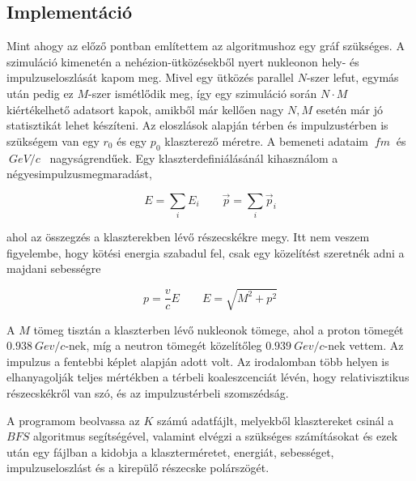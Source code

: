 \documentclass[a4paper,12pt]{article}
\begin{document}
\subsection{ Implementáció}

\par Mint ahogy az előző pontban említettem az algoritmushoz egy gráf szükséges. A szimuláció kimenetén a nehézion-ütközésekből nyert nukleonon hely- és impulzuseloszlását kapom meg. Mivel egy ütközés parallel $N$-szer lefut, egymás után pedig ez $M$-szer ismétlődik meg, így egy szimuláció során $N\cdot M$ kiértékelhető adatsort kapok, amikből már kellően nagy $N, M$ esetén már jó statisztikát lehet készíteni. Az eloszlások alapján térben és impulzustérben is szükségem van egy $r_{0}$ és egy $p_{0}$ klaszterező méretre. A bemeneti adataim $~fm~$ és $~GeV/c$~ nagyságrendűek. Egy klaszterdefiniálásánál kihasználom a négyesimpulzusmegmaradást, 

\begin{equation*}
	E = \sum_{i} E_{i} \quad \quad \vec{p} = \sum_{i} \vec{p}_{i}
\end{equation*} 

\par ahol az összegzés a klaszterekben lévő részecskékre megy. Itt nem veszem figyelembe, hogy kötési energia szabadul fel, csak egy közelítést szeretnék adni a majdani sebességre

\begin{equation*}
	p = \frac{v}{c} E \quad \quad E = \sqrt{M^{2} + p^{2}}
\end{equation*}

\par A $M$ tömeg tisztán a klaszterben lévő nukleonok tömege, ahol a proton tömegét $0.938 ~Gev/c$-nek, míg a neutron tömegét közelítőleg $0.939 ~Gev/c$-nek vettem. Az impulzus a fentebbi képlet alapján adott volt. Az irodalomban több helyen is elhanyagolják teljes mértékben a térbeli koaleszcenciát lévén, hogy relativisztikus részecskékről van szó, és az impulzustérbeli szomszédság. 

\par A programom beolvassa az $K$ számú adatfájlt, melyekből klasztereket csinál a $BFS$ algoritmus segítségével, valamint elvégzi a szükséges számításokat és ezek után egy fájlban a kidobja a klaszterméretet, energiát, sebességet, impulzuseloszlást és a kirepülő részecske polárszögét.
\end{document}
